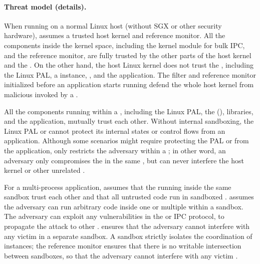 \paragraph{Threat model (details).}
When running on a normal Linux host (without SGX or other security hardware), \graphene{} assumes a trusted host kernel and reference monitor.
All the components inside the kernel space, including the  kernel module for bulk IPC, and the reference monitor,
are fully trusted by the other parts of the host kernel and the \graphene{} \picoprocs{}.
On the other hand,
the host Linux kernel does not trust the \picoproc{}, including the Linux PAL, a \thelibos{} instance, \glibc{}, and the application.
The \linuxapi{} filter and reference monitor
initialized before an application starts running
defend the whole host kernel from malicious \linuxapis{} invoked by a \picoproc{}.



All the components running within a \picoproc{}, including the Linux PAL, the \libos{} (\thelibos{}), \glibc{} libraries, and the application,
mutually trust each other. %
Without internal sandboxing, the Linux PAL or \thelibos{}
cannot protect its internal states or control flows from an application.
Although some scenarios might require protecting the PAL or \thelibos{}
from the application,
\graphene{} only restricts the adversary
within a \picoproc{};
in other word, an adversary
only compromises the \libos{} in the same \picoproc{},
but can never interfere the host kernel 
or other unrelated \picoprocs{}.



For a multi-process application,
\graphene{} assumes that the \picoprocs{} 
running inside the same sandbox
trust each other and that all untrusted code run in sandboxed \picoprocs{}.
\graphene{} assumes the adversary can run arbitrary code inside
one or multiple \picoprocs within a sandbox.
The adversary can exploit any vulnerabilities in the \libos{}
or IPC protocol,
to propagate the attack to other \picoprocs{}.
\graphene{} ensures that
the adversary cannot interfere with any victim \picoprocs{}
in a separate sandbox.
A sandbox strictly isolates the coordination of \thelibos{} instances;
the reference monitor ensures
that there is no writable intersection between sandboxes, so that
the adversary cannot interfere with any victim \picoprocs{}.


